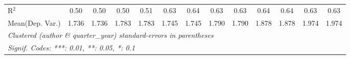 \begin{tabular}{lcccccccccccc}
   R$^2$                                    & 0.50    & 0.50          & 0.50    & 0.51          & 0.63    & 0.64    & 0.63    & 0.63    & 0.64          & 0.64          & 0.63    & 0.63\\  
Mean(Dep. Var.) & 1.736 & 1.736 & 1.783 & 1.783 & 1.745 & 1.745 & 1.790 & 1.790 & 1.878 & 1.878 & 1.974 & 1.974 \\
   \midrule \midrule
   \multicolumn{13}{l}{\emph{Clustered (author \& quarter\_year) standard-errors in parentheses}}\\
   \multicolumn{13}{l}{\emph{Signif. Codes: ***: 0.01, **: 0.05, *: 0.1}}\\
\end{tabular}
\par\endgroup

